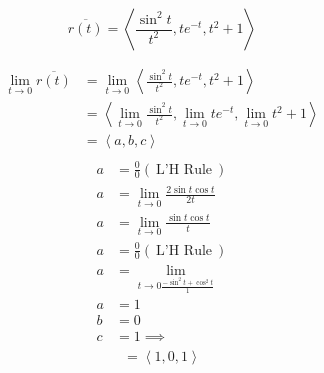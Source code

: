 \begin{example}
	\[\overline{r(t)} = \left< \frac{\sin^2 t}{t^2}, t e^{-t}, t^2+1 \right>\]

	\begin{align*}
	\lim_{t \to 0}\overline{r(t)} &=  \lim_{t \to 0}\left< \frac{\sin^2 t}{t^2}, t e^{-t}, t^2+1 \right> \\
	&=  \left< \lim_{t \to 0} \frac{\sin^2 t}{t^2}, \lim_{t \to 0}t e^{-t}, \lim_{t \to 0}t^2+1 \right> \\
	&=  \left< a, b ,c \right> \\
	\end{align*}
	\begin{align*}
		a &=  \frac{0}{0}(\:\text{L'H Rule}\:) \\
		a &= \lim_{t \to 0}\frac{2 \sin t \cos t}{2 t} \\
		a &= \lim_{t \to 0}\frac{\sin t \cos t}{t} \\
		a &=  \frac{0}{0}(\:\text{L'H Rule}\:) \\
		a &=  \lim_{t \to 0 \frac{-\sin^2 t + \cos^2 t}{1}} \\
		a &=  1 \\
		b &=  0 \\
		c &=  1 \implies\\
	\end{align*}
	\[ = \boxed{ \left<1,0,1 \right>}\]

\end{example}











\newpage


